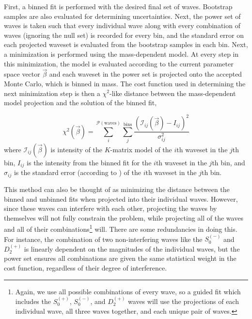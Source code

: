 First, a binned fit is performed with the desired final set of waves. Bootstrap samples are also evaluated for determining uncertainties. Next, the power set of waves is taken such that every individual wave along with every combination of waves (ignoring the null set) is recorded for every bin, and the standard error on each projected waveset is evaluated from the bootstrap samples in each bin. Next, a minimization is performed using the mass-dependent model. At every step in this minimization, the model is evaluated according to the current parameter space vector $\vec{\beta}$ and each waveset in the power set is projected onto the accepted Monte Carlo, which is binned in mass. The cost function used in determining the next minimization step is then a $\chi^2$-like distance between the mass-dependent model projection and the solution of the binned fit,

\begin{equation}
  \chi^2(\vec{\beta}) = \sum_i^{\mathcal{P}(\text{waves})} \sum_j^{\text{bins}} \frac{(\mathcal{I}_{ij}(\vec{\beta}) - I_{ij})^2}{\sigma_{ij}^2}
\end{equation}
where $\mathcal{I}_{ij}(\vec{\beta})$ is intensity of the $K$-matrix model of the $i$th waveset in the $j$th bin, $I_{ij}$ is the intensity from the binned fit for the $i$th waveset in the $j$th bin, and $\sigma_{ij}$ is the standard error (according to ) of the $i$th waveset in the $j$th bin.

This method can also be thought of as minimizing the distance between the binned and unbinned fits when projected into their individual waves. However, since these waves can interfere with each other, projecting the waves by themselves will not fully constrain the problem, while projecting all of the waves and all of their combinations\footnote{Again, we use all possible combinations of every wave, so a guided fit which includes the $S_0^{(+)}$, $S_0^{(-)}$, and $D_2^{(+)}$ waves will use the projections of each individual wave, all three waves together, and each unique pair of waves.} will. There are some redundancies in doing this. For instance, the combination of two non-interfering waves like the $S_0^{(-)}$ and $D_2^{(+)}$ is linearly dependent on the magnitudes of the individual waves, but the power set ensures all combinations are given the same statistical weight in the cost function, regardless of their degree of interference.

